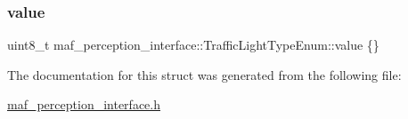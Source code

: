 \subsubsection{\texorpdfstring{value}{value}}
{\footnotesize\ttfamily uint8\+\_\+t maf\+\_\+perception\+\_\+interface\+::\+Traffic\+Light\+Type\+Enum\+::value \{\}}



The documentation for this struct was generated from the following file\+:\begin{DoxyCompactItemize}
\item 
\hyperlink{maf__perception__interface_8h}{maf\+\_\+perception\+\_\+interface.\+h}\end{DoxyCompactItemize}
